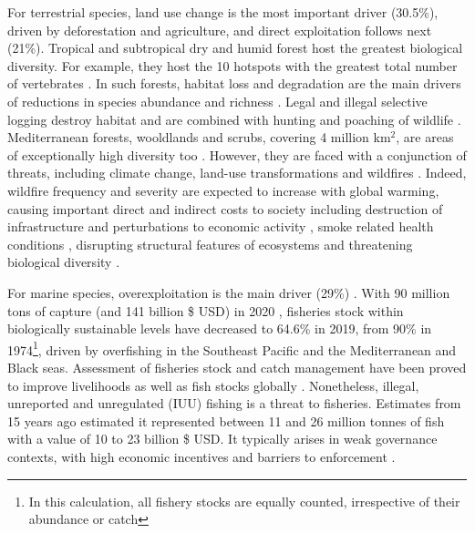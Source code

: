 For terrestrial species, land use change is the most important driver (30.5\%), driven by deforestation and agriculture, and direct exploitation follows next (21\%). 
Tropical and subtropical dry and humid forest host the greatest biological diversity. For example, they host the 10 hotspots with the greatest total number of vertebrates \citep{mittermeier_global_2011}. In such forests, habitat loss and degradation are the main drivers of reductions in species abundance and richness \citep{newbold_global_2014}. Legal and illegal selective logging destroy habitat \citep{hoare2022establishing,  bousfield_2023_large} and are combined with hunting and poaching of wildlife \citep{gallego_2020_combined}. Mediterranean forests, wooldlands and scrubs, covering 4 million km$^2$, are areas of exceptionally high diversity too \citep{Mooney2001, blondel_2010}. However, they are faced with a conjunction of threats, including climate change, land-use transformations \citep{newbold_tropical_2020} and wildfires \citep{Dupuy2019ClimateCI}. Indeed, wildfire frequency and severity are expected to increase with global warming, causing important direct and indirect costs to society including destruction of infrastructure and perturbations to economic activity \citep{wang_economic_2021}, smoke related health conditions \citep{burke_wildfire_2023, heft-neal_behavior_2023}, disrupting structural features of ecosystems \citep{Ayars2023} and threatening biological diversity \citep{Wintle2020}.

For marine species, overexploitation is the main driver (29\%) \citep{ipbes_2022_6417333}. With 90 million tons of capture (and 141 billion \$ USD) in 2020 \citep{fao_2022_state}, fisheries stock within biologically sustainable levels have decreased to 64.6\% in 2019, from 90\% in 1974\footnote{ In this calculation, all fishery stocks are equally counted, irrespective of their abundance or catch}, driven by overfishing in the Southeast Pacific and the Mediterranean and Black seas. Assessment of fisheries stock and catch management have been proved to improve livelihoods as well as fish stocks globally \citep{melnychuk_2017_fisheries, hilborn_2020_effective}. Nonetheless, illegal, unreported and unregulated (IUU) fishing is a threat to fisheries. Estimates from 15 years ago \citep{agnew_estimating_2009} estimated it represented between 11 and 26 million tonnes of fish with a value of 10 to 23 billion \$ USD. It typically arises in weak governance contexts, with high economic incentives and barriers to enforcement \citep{iuu_2020_widjaja}. 

